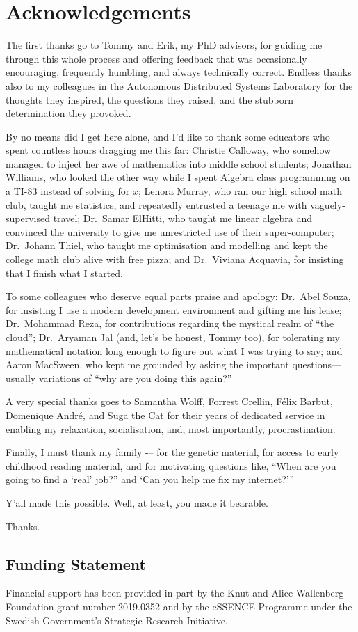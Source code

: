 \chapter*{Acknowledgements}

The first thanks go to Tommy and Erik, my PhD advisors, for guiding me through this whole process and offering feedback that was occasionally encouraging, frequently humbling, and always technically correct. 
Endless thanks also to my colleagues in the Autonomous Distributed Systems Laboratory for the thoughts they inspired, the questions they raised, and the stubborn determination they provoked.

By no means did I get here alone, and I’d like to thank some educators who spent countless hours dragging me this far: Christie Calloway, who somehow managed to inject her awe of mathematics into middle school students;
Jonathan Williams, who looked the other way while I spent Algebra class programming on a TI-83 instead of solving for $x$;
Lenora Murray, who ran our high school math club, taught me statistics, and repeatedly entrusted a teenage me with vaguely-supervised travel;
Dr.\ Samar ElHitti, who taught me linear algebra and convinced the university to give me unrestricted use of their super-computer;
Dr.\ Johann Thiel, who taught me optimisation and modelling and kept the college math club alive with free pizza;
and Dr.\ Viviana Acquavia, for insisting that I finish what I started.

To some colleagues who deserve equal parts praise and apology:
Dr.\ Abel Souza, for insisting I use a modern development environment and gifting me his lease;
Dr.\ Mohammad Reza, for contributions regarding the mystical realm of ``the cloud'';
Dr.\ Aryaman Jal (and, let’s be honest, Tommy too), for tolerating my mathematical notation long enough to figure out what I was trying to say;
and Aaron MacSween, who kept me grounded by asking the important questions---usually variations of ``why are you doing this again?''

A very special thanks goes to Samantha Wolff, Forrest Crellin, Félix Barbut, Domenique André, and Suga the Cat for their years of dedicated service in enabling my relaxation, socialisation, and, most importantly, procrastination. 

Finally, I must thank my family -– for the genetic material, for access to early childhood reading material, and for motivating questions like, ``When are you going to find a `real' job?'' and `Can you help me fix my internet?'''

Y'all made this possible. Well, at least, you made it bearable. 

Thanks.

\section*{Funding Statement}

Financial support has been provided in part by the Knut and Alice Wallenberg Foundation grant number 2019.0352 and by the eSSENCE Programme under the Swedish Government's Strategic Research Initiative.
